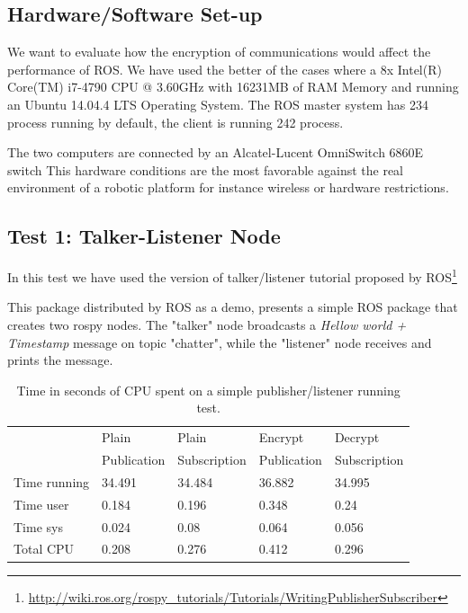 \documentclass[journal,twoside]{JoPhA}
\begin{document}
\subsection{Hardware/Software Set-up}



We want to evaluate how the encryption of communications would affect the performance of ROS.
We have used the better of the cases where a 8x Intel(R) Core(TM) i7-4790 CPU @ 3.60GHz
with 16231MB of RAM Memory	and running an Ubuntu 14.04.4 LTS Operating System.
The ROS master system has 234 process running by default, the client is running 242 process.

The two computers are connected by an  Alcatel-Lucent OmniSwitch 6860E switch
This hardware conditions are the most favorable against the real environment of a robotic platform for instance wireless or hardware restrictions.


\subsection{Test 1: Talker-Listener Node}

In this test we have used the version of talker/listener tutorial proposed by ROS\footnote{\url{http://wiki.ros.org/rospy_tutorials/Tutorials/WritingPublisherSubscriber}}

This package distributed by ROS as a demo, presents a simple ROS package that creates two rospy nodes. The "talker" node broadcasts a {\em Hellow world + Timestamp} message on topic "chatter", while the "listener" node receives and prints the message.


\begin{table}[h]
	\centering
	\caption{Time in seconds of CPU spent on a simple publisher/listener running test.}
	\label{tab:time_simple_text_hellow_CPU}
	\begin{tabular}{|l|l|l|l|l|}
		\hline
		&		Plain&	Plain&	Encrypt&	Decrypt \\
		&		Publication&Subscription&Publication&Subscription \\\hline
		Time running&34.491&	34.484&	36.882&	34.995 \\\hline
		Time user&0.184&	0.196&	0.348&	0.24 \\\hline
		Time sys&0.024&	0.08&	0.064&	0.056 \\\hline
		Total CPU&0.208&	0.276&	0.412&	0.296 \\\hline
		
	\end{tabular}
\end{table}
\end{document}
